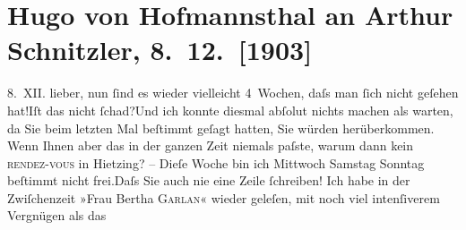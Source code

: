 

         \renewcommand{\erwaehnteOrte}{Orte: Rodaun, Wien, XIII., Hietzing}
         \renewcommand{\erwaehnteWerke}{Werke: Das gerettete Venedig. Trauerspiel in fünf Aufzügen, Der einsame Weg. Schauspiel in fünf Akten, Die Frau des Weisen. Novelletten, Elektra. Tragödie in einem Aufzug, Frau Bertha Garlan. Roman, Sterben. Novelle}
               \section[Hugo von Hofmannsthal an Arthur Schnitzler, 8. 12. {[}1903{]}]{ Hugo von Hofmannsthal an Arthur Schnitzler, 8. 12. {[}1903{]}}\nopagebreak{}\rehead{ }\begin{ledgroupsized}[t]{13cm}\normalsize\beginnumbering \toendnotes[C]{\smallbreak\pagebreak[2]} 
\toendnotes[C]{\smallbreak}\pstart
           \raggedleft{}{\pb}8. XII.\pend
           \pstart{}lieber,\pend\pstart
           nun ſind es wieder vielleicht 4 Wochen, daſs man ſich nicht geſehen hat!\hspace*{1em}Iſt das nicht ſchad?\hspace*{1.5em}Und ich konnte diesmal abſolut nichts machen als warten, da Sie beim letzten Mal
               beſtimmt geſagt hatten, Sie würden herüberkommen. Wenn Ihnen aber das in der ganzen
                  {\pb}Zeit niemals paſste, warum
               dann kein \textsc{rendez-vous} in Hietzing? –\pend
           \pstart
           Dieſe Woche bin ich Mittwoch Samstag Sonntag beſtimmt nicht frei.\hspace*{1.5em}Daſs Sie auch nie eine Zeile ſchreiben! \pend
           \pstart
           Ich habe in der Zwiſchenzeit »Frau Bertha \textsc{Garlan}« wieder geleſen, mit noch viel {\pb}intenſiverem Vergnügen als das

\end{ledgroupsized}
